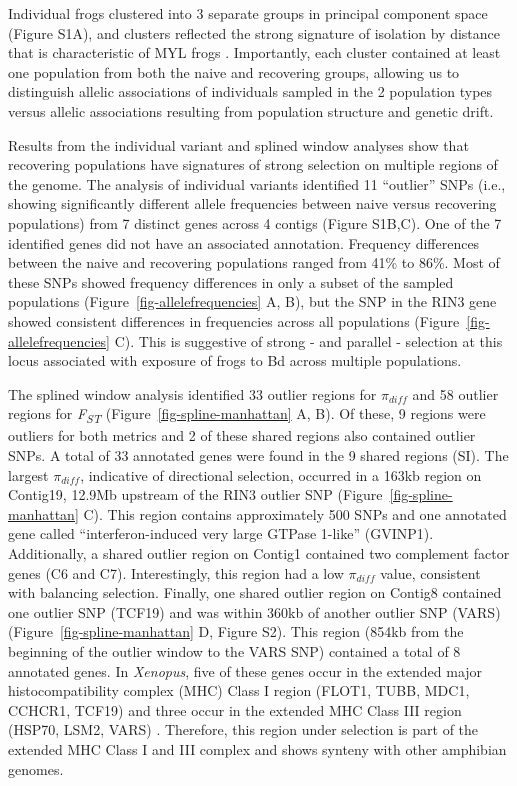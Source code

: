 \documentclass[9pt,twocolumn,twoside,lineno]{pnas-new}
\begin{document}
Individual frogs clustered into 3 separate groups in principal component
space (Figure S1A), and clusters reflected the
strong signature of isolation by distance that is characteristic of MYL
frogs \citep{rothstein2020, poorten2017}. Importantly, each cluster
contained at least one population from both the naive and recovering
groups, allowing us to distinguish allelic associations of individuals
sampled in the 2 population types versus allelic associations resulting
from population structure and genetic drift.

Results from the individual variant and splined window analyses show
that recovering populations have signatures of strong selection on
multiple regions of the genome. The analysis of individual variants
identified 11 ``outlier'' SNPs (i.e., showing significantly different
allele frequencies between naive versus recovering populations) from 7
distinct genes across 4 contigs (Figure S1B,C). One of the 7 identified genes did not have an associated
annotation. Frequency differences between the naive and recovering
populations ranged from 41\% to 86\%. Most of these SNPs showed
frequency differences in only a subset of the sampled populations
(Figure~\ref{fig-allelefrequencies} A, B), but the SNP in the RIN3 gene
showed consistent differences in frequencies across all populations
(Figure~\ref{fig-allelefrequencies} C). This is suggestive of strong -
and parallel - selection at this locus associated with exposure of frogs
to Bd across multiple populations.

The splined window analysis identified 33 outlier regions for
\(\pi_{diff}\) and 58 outlier regions for \emph{F\textsubscript{ST}}
(Figure~\ref{fig-spline-manhattan} A, B). Of these, 9 regions were
outliers for both metrics and 2 of these shared regions also contained
outlier SNPs. A total of 33 annotated genes were found in the 9 shared
regions (SI). The largest \(\pi_{diff}\), indicative of directional
selection, occurred in a 163kb region on Contig19, 12.9Mb upstream of
the RIN3 outlier SNP (Figure~\ref{fig-spline-manhattan} C). This region
contains approximately 500 SNPs and one annotated gene called
``interferon-induced very large GTPase 1-like'' (GVINP1). Additionally,
a shared outlier region on Contig1 contained two complement factor genes
(C6 and C7). Interestingly, this region had a low \(\pi_{diff}\) value,
consistent with balancing selection. Finally, one shared outlier region
on Contig8 contained one outlier SNP (TCF19) and was within 360kb of
another outlier SNP (VARS) (Figure~\ref{fig-spline-manhattan} D,
Figure S2). This region (854kb from the beginning of
the outlier window to the VARS SNP) contained a total of 8 annotated
genes. In \emph{Xenopus}, five of these genes occur in the extended
major histocompatibility complex (MHC) Class I region (FLOT1, TUBB,
MDC1, CCHCR1, TCF19) and three occur in the extended MHC Class III
region (HSP70, LSM2, VARS) \citep{ohta2006}. Therefore, this region
under selection is part of the extended MHC Class I and III complex and
shows synteny with other amphibian genomes.
\end{document}
